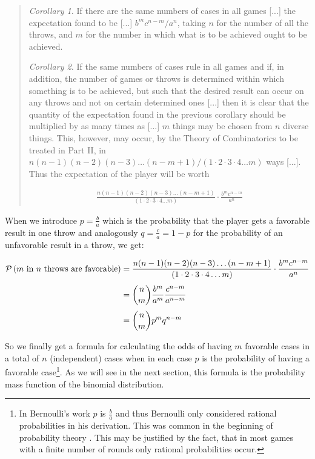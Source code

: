 \begin{quotation}
  \emph{Corollary 1.} If there are the same numbers of cases in all games [...] the expectation found to be [...] $b^mc^{n-m}/a^n$, taking $n$ for the number of all the throws, and $m$ for the number in which what is to be achieved ought to be achieved.

  \emph{Corollary 2.} If the same numbers of cases rule in all games and if, in addition, the number of games or throws is determined within which something is to be achieved, but such that the desired result can occur on any throws and not on certain determined ones [...] then it is clear that the quantity of the expectation found in the previous corollary should be multiplied by as many times as [...] $m$ things may be chosen from $n$ diverse things. This, however, may occur, by the Theory of Combinatorics to be treated in Part II, in $n(n-1)(n-2)(n-3)\ldots(n-m+1)/(1\cdot 2\cdot 3\cdot 4\ldots m)$ ways [...]. Thus the expectation of the player will be worth

  \begin{align*}
    \frac{n(n-1)(n-2)(n-3)\ldots(n-m+1)}{(1\cdot 2\cdot 3\cdot 4\ldots m)}\cdot \frac{b^mc^{n-m}}{a^n}
  \end{align*}
\end{quotation}

When we introduce $p=\tfrac ba$ which is the probability that the player gets a favorable result in one throw and analogously $q=\tfrac ca=1-p$ for the probability of an unfavorable result in a throw, we get:

\begin{align}
  \P{\text{$m$ in $n$ throws are favorable}} & = \frac{n(n-1)(n-2)(n-3)\ldots(n-m+1)}{(1\cdot 2\cdot 3\cdot 4\ldots m)}\cdot \frac{b^mc^{n-m}}{a^n} \nl
  &= \binom nm \frac{b^m}{a^m} \frac{c^{n-m}}{a^{n-m}} \nl
  &= \binom nm p^m q^{n-m}
\end{align}

So we finally get a formula for calculating the odds of having $m$ favorable cases in a total of $n$ (independent) cases when in each case $p$ is the probability of having a favorable case\footnote{In Bernoulli's work $p$ is $\tfrac ba$ and thus Bernoulli only considered rational probabilities in his derivation. This was common in the beginning of probability theory . This may be justified by the fact, that in most games with a finite number of rounds only rational probabilities occur.}. As we will see in the next section, this formula is the probability mass function of the binomial distribution.

